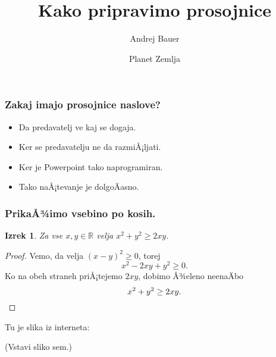 \documentclass[14pt]{beamer}
\newtheorem{izrek}{Izrek}
\begin{document}
\title{Kako pripravimo prosojnice}
\author{Andrej Bauer}
\date{Planet Zemlja}

\begin{frame}
  \titlepage

\end{frame}

\begin{frame}
  \frametitle{Zakaj imajo prosojnice naslove?}

  \begin{itemize}
  \item Da predavatelj ve kaj se dogaja.
  \item Ker se predavatelju ne da razmiÅ¡ljati.
  \item Ker je Powerpoint tako naprogramiran.
  \item Tako naÅ¡tevanje je dolgoÄasno.
  \end{itemize}


\end{frame}

\begin{frame}
  \frametitle{PrikaÅ¾imo vsebino po kosih.}

  \begin{izrek}
    Za vse $x, y \in \mathbb{R}$ velja $x^2 + y^2 \geq 2 x y$.
  \end{izrek}

  \pause

  \begin{proof}
    Vemo, da velja $(x - y)^2 \geq 0$, torej
    \begin{equation*}
      x^2 - 2 x y + y^2 \geq 0.
    \end{equation*}
    \pause
    Ko na obeh straneh priÅ¡tejemo $2 x y$, dobimo Å¾eleno neenaÄbo
    \begin{equation*}
      x^2 + y^2 \geq 2 x y. \qedhere
    \end{equation*}
  \end{proof}

\end{frame}

\begin{frame}
  Tu je slika iz interneta:
  \begin{center}
    (Vstavi sliko sem.)
  \end{center}


\end{frame}
\end{document}

